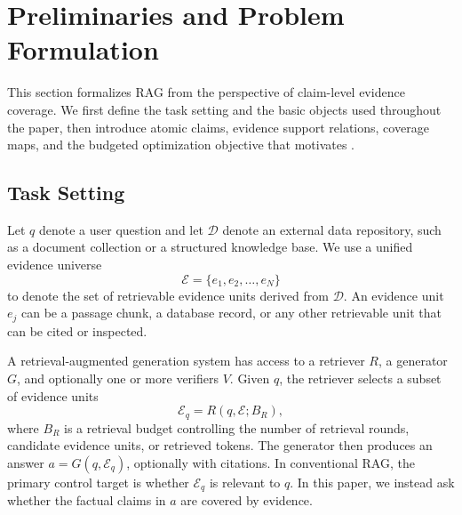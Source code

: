\section{Preliminaries and Problem Formulation}
\label{sec:problem_formulation}

This section formalizes RAG from the perspective of claim-level evidence coverage. We first define the task setting and the basic objects used throughout the paper, then introduce atomic claims, evidence support relations, coverage maps, and the budgeted optimization objective that motivates \ragname.

\subsection{Task Setting}
\label{subsec:task_setting}

Let $q$ denote a user question and let $\mathcal{D}$ denote an external data repository, such as a document collection or a structured knowledge base. We use a unified evidence universe
\begin{equation}
    \mathcal{E} = \{e_1, e_2, \ldots, e_N\}
\end{equation}
to denote the set of retrievable evidence units derived from $\mathcal{D}$. An evidence unit $e_j$ can be a passage chunk, a database record, or any other retrievable unit that can be cited or inspected.

A retrieval-augmented generation system has access to a retriever $R$, a generator $G$, and optionally one or more verifiers $V$. Given $q$, the retriever selects a subset of evidence units
\begin{equation}
    \mathcal{E}_q = R(q, \mathcal{E}; B_R),
\end{equation}
where $B_R$ is a retrieval budget controlling the number of retrieval rounds, candidate evidence units, or retrieved tokens. The generator then produces an answer $a = G(q, \mathcal{E}_q)$, optionally with citations. In conventional RAG, the primary control target is whether $\mathcal{E}_q$ is relevant to $q$. In this paper, we instead ask whether the factual claims in $a$ are covered by evidence.

